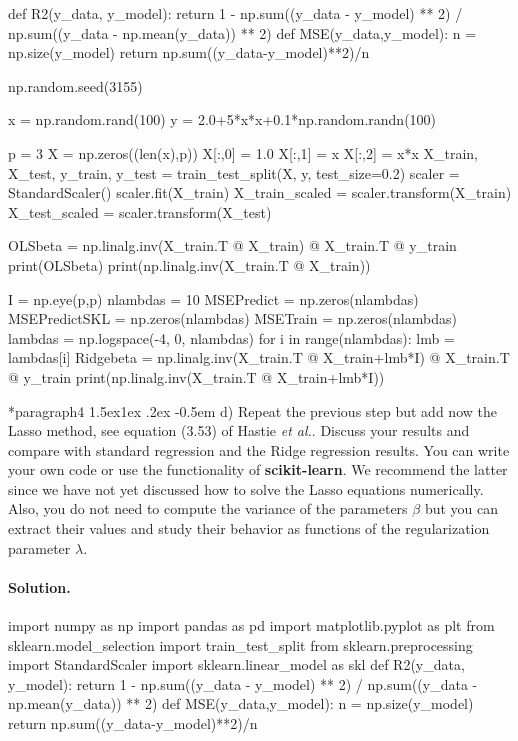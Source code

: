 \documentclass[%
oneside,                 %
final,                   %
10pt]{article}
\makeatletter
\newenvironment{doconceexercise}{}{}
\newcommand\subex{\@startsection*{paragraph}{4}{\z@}%
                  {1.5ex\@plus1ex \@minus.2ex}%
                  {-0.5em}%
                  {\normalfont\normalsize\bfseries}}
\makeatother
\begin{document}
\begin{doconceexercise}
def R2(y_data, y_model):
    return 1 - np.sum((y_data - y_model) ** 2) / np.sum((y_data - np.mean(y_data)) ** 2)
def MSE(y_data,y_model):
    n = np.size(y_model)
    return np.sum((y_data-y_model)**2)/n


np.random.seed(3155)

x = np.random.rand(100)
y = 2.0+5*x*x+0.1*np.random.randn(100)

p = 3
X = np.zeros((len(x),p))
X[:,0] = 1.0
X[:,1] = x
X[:,2] = x*x
X_train, X_test, y_train, y_test = train_test_split(X, y, test_size=0.2)
scaler = StandardScaler()
scaler.fit(X_train)
X_train_scaled = scaler.transform(X_train)
X_test_scaled = scaler.transform(X_test)

OLSbeta = np.linalg.inv(X_train.T @ X_train) @ X_train.T @ y_train
print(OLSbeta)
print(np.linalg.inv(X_train.T @ X_train))

I = np.eye(p,p)
nlambdas = 10
MSEPredict = np.zeros(nlambdas)
MSEPredictSKL = np.zeros(nlambdas)
MSETrain = np.zeros(nlambdas)
lambdas = np.logspace(-4, 0, nlambdas)
for i in range(nlambdas):
    lmb = lambdas[i]
    Ridgebeta = np.linalg.inv(X_train.T @ X_train+lmb*I) @ X_train.T @ y_train
    print(np.linalg.inv(X_train.T @ X_train+lmb*I))


\subex{d)}
Repeat the previous step but add now the Lasso method, see equation (3.53) of Hastie \emph{et al.}. Discuss your results and compare with standard regression and the Ridge regression results. You can write your own code or use the functionality of \textbf{scikit-learn}.  We recommend the latter since we have not yet discussed how to solve the Lasso equations numerically. Also, you do not need to compute the variance of the parameters $\beta$ but you can extract their values and study their behavior as functions of the regularization parameter $\lambda$.


\paragraph{Solution.}
import numpy as np
import pandas as pd
import matplotlib.pyplot as plt
from sklearn.model_selection import train_test_split
from sklearn.preprocessing import StandardScaler
import sklearn.linear_model as skl
def R2(y_data, y_model):
    return 1 - np.sum((y_data - y_model) ** 2) / np.sum((y_data - np.mean(y_data)) ** 2)
def MSE(y_data,y_model):
    n = np.size(y_model)
    return np.sum((y_data-y_model)**2)/n



\end{doconceexercise}
\end{document}
